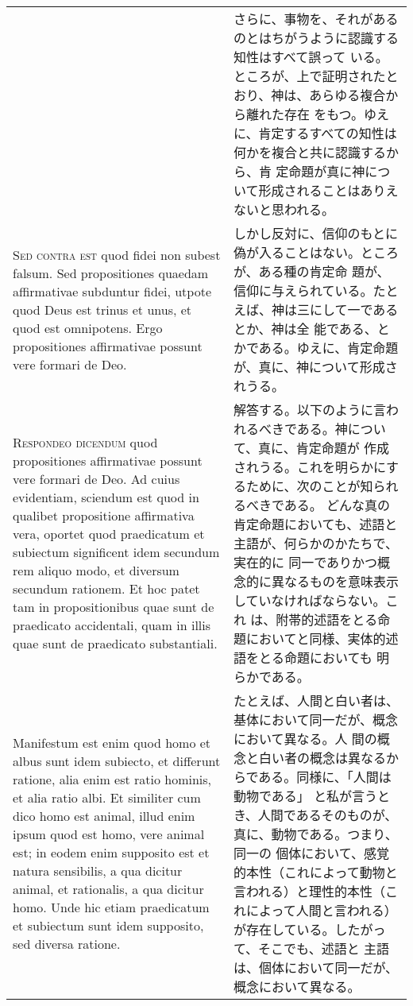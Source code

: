 \documentclass[10pt]{jsarticle}
\begin{document}
\begin{longtable}{p{21em}p{21em}}
&

さらに、事物を、それがあるのとはちがうように認識する知性はすべて誤って
いる。ところが、上で証明されたとおり、神は、あらゆる複合から離れた存在
をもつ。ゆえに、肯定するすべての知性は何かを複合と共に認識するから、肯
定命題が真に神について形成されることはありえないと思われる。

\\

{\scshape Sed contra est} quod fidei non subest falsum. Sed
propositiones quaedam affirmativae subduntur fidei, utpote quod Deus
est trinus et unus, et quod est omnipotens. Ergo propositiones
affirmativae possunt vere formari de Deo.

&

しかし反対に、信仰のもとに偽が入ることはない。ところが、ある種の肯定命
題が、信仰に与えられている。たとえば、神は三にして一であるとか、神は全
能である、とかである。ゆえに、肯定命題が、真に、神について形成されうる。

\\

{\scshape Respondeo dicendum} quod propositiones affirmativae possunt
vere formari de Deo. Ad cuius evidentiam, sciendum est quod in
qualibet propositione affirmativa vera, oportet quod praedicatum et
subiectum significent idem secundum rem aliquo modo, et diversum
secundum rationem. Et hoc patet tam in propositionibus quae sunt de
praedicato accidentali, quam in illis quae sunt de praedicato
substantiali.

&

解答する。以下のように言われるべきである。神について、真に、肯定命題が
作成されうる。これを明らかにするために、次のことが知られるべきである。
どんな真の肯定命題においても、述語と主語が、何らかのかたちで、実在的に
同一でありかつ概念的に異なるものを意味表示していなければならない。これ
は、附帯的述語をとる命題においてと同様、実体的述語をとる命題においても
明らかである。

\\

Manifestum est enim quod homo et albus sunt idem subiecto, et
differunt ratione, alia enim est ratio hominis, et alia ratio albi. Et
similiter cum dico homo est animal, illud enim ipsum quod est homo,
vere animal est; in eodem enim supposito est et natura sensibilis, a
qua dicitur animal, et rationalis, a qua dicitur homo.  Unde hic etiam
praedicatum et subiectum sunt idem supposito, sed diversa ratione.

&

たとえば、人間と白い者は、基体において同一だが、概念において異なる。人
間の概念と白い者の概念は異なるからである。同様に、「人間は動物である」
と私が言うとき、人間であるそのものが、真に、動物である。つまり、同一の
個体において、感覚的本性（これによって動物と言われる）と理性的本性（こ
れによって人間と言われる）が存在している。したがって、そこでも、述語と
主語は、個体において同一だが、概念において異なる。


\end{longtable}
\end{document}
